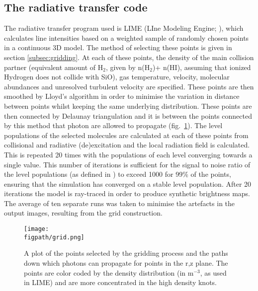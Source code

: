 \documentclass[useAMS,usenatbib]{mn2e}
\newcommand{\figpath}{/Users/bhargavvaidya/MyProject/work/Leeds_Uni/SiOJets_New/PAPER/PFIGS/}
\begin{document}
\subsection{The radiative transfer code} \label{subsec:radiative_transfer_code}
The radiative transfer program used is LIME (LIne Modeling Engine;
\citealt{Brinch:2010p13078}), which  calculates line intensities based
on a weighted sample of randomly chosen points in a continuous 3D
model. The method of selecting these points is given in section
\ref{subsec:gridding}. At each of these points, the density of the
main collision partner (equivalent amount of H$_2$, given by n(H$_2$)+
n(HI), assuming that ionized Hydrogen does not collide with SiO), gas temperature, velocity, molecular abundances and unresolved turbulent velocity are specified. These points are then smoothed by Lloyd's algorithm \citep{Lloyd1982} in order to minimise the variation in distance between points whilst keeping the same underlying distribution. These points are then connected by Delaunay triangulation and it is between the points connected by this method that photon are allowed to propagate (fig.~\ref{grid}). The level populations of the selected molecules are calculated at each of these points from collisional and radiative (de)excitation and the local radiation field is calculated. This is repeated 20 times with the populations of each level converging towards a single value. This number of iterations is sufficient for the signal to noise ratio of the level populations (as defined in \citealt{Brinch:2010p13078}) to exceed 1000 for 99\% of the points, ensuring that the simulation has converged on a stable level population. After 20 iterations the model is ray-traced in order to produce synthetic brightness maps. The average of ten separate runs was taken to minimise the artefacts in the output images, resulting from the grid construction.%


\begin{figure}
 \texttt{[image: \\figpath/grid.png]}
 \caption{A plot of the points selected by the gridding process and the paths down which photons can propagate for points in the r,z plane. The points are color coded by the density distribution (in m$^{-3}$, as used in LIME) and are more concentrated in the high density knots.}
\label{grid} %
\end{figure}
\end{document}
